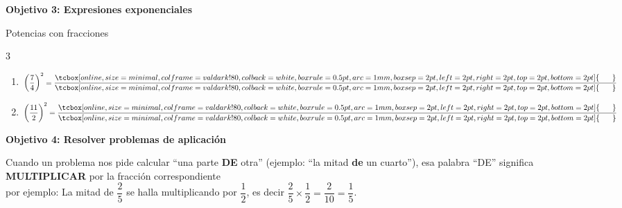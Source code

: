 \documentclass[12pt, letterpaper]{article}
\newenvironment{objetivo}[1]{%
    \begin{tcolorbox}[colback=valblue!10, colframe=valblue, arc=2mm, boxrule=1.5pt]
        {\large\bfseries \ding{118} #1}
    \end{tcolorbox}
}{}
\newcommand{\boxfill}[1][0.8cm]{\tcbox[on line, size=minimal, colframe=valdark!80, colback=white, boxrule=0.5pt, arc=1mm, boxsep=2pt, left=2pt, right=2pt, top=2pt, bottom=2pt]{\makebox[#1]{\vphantom{M}}}}
\begin{document}
\begin{objetivo}{Objetivo 3: Expresiones exponenciales}
\begin{practica}{Potencias con fracciones}
\begin{multicols}{3}
\begin{enumerate}[itemsep=0.6cm]
                \item $\left(\dfrac{7}{4}\right)^2 = \dfrac{\boxfill[0.6cm]}{\boxfill[0.6cm]}$
                \item $\left(\dfrac{11}{2}\right)^2 = \dfrac{\boxfill[0.6cm]}{\boxfill[0.6cm]}$
            \end{enumerate}
        \end{multicols}
    \end{practica}
\end{objetivo}

\begin{objetivo}{Objetivo 4: Resolver problemas de aplicación}
    \begin{concepto}
        Cuando un problema nos pide calcular ``una parte \textbf{DE} otra'' (ejemplo: ``la mitad \textbf{de} un cuarto''), esa palabra ``DE'' significa \textbf{MULTIPLICAR} por la fracción correspondiente\\ por ejemplo: La mitad de $\dfrac{2}{5}$ se halla multiplicando por $\dfrac{1}{2}$, es decir $\dfrac{2}{5}\times\dfrac{1}{2}=\dfrac{2}{10}=\dfrac{1}{5}$.
    \end{concepto}
    

\end{objetivo}
\end{document}
